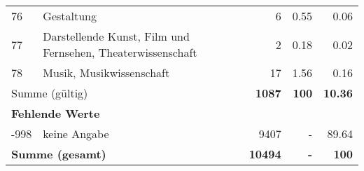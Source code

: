 \begin{longtable}{lXrrr}
        76 & \multicolumn{1}{X}{Gestaltung} & %
          \num{6} &
          \num[round-mode=places,round-precision=2]{0,55} &
          \num[round-mode=places,round-precision=2]{0,06} \\

        77 & \multicolumn{1}{X}{Darstellende Kunst, Film und Fernsehen, Theaterwissenschaft} & %
          \num{2} &
          \num[round-mode=places,round-precision=2]{0,18} &
          \num[round-mode=places,round-precision=2]{0,02} \\

        78 & \multicolumn{1}{X}{Musik, Musikwissenschaft} & %
          \num{17} &
          \num[round-mode=places,round-precision=2]{1,56} &
          \num[round-mode=places,round-precision=2]{0,16} \\

     \midrule
     \multicolumn{2}{l}{Summe (gültig)} &
       \textbf{\num{1087}} &
     \textbf{100} &
       \textbf{\num[round-mode=places,round-precision=2]{10,36}} \\
     \multicolumn{5}{l}{\textbf{Fehlende Werte}}\\
       -998 &
       keine Angabe &
         \num{9407} &
        - &
         \num[round-mode=places,round-precision=2]{89,64} \\
     \midrule
     \multicolumn{2}{l}{\textbf{Summe (gesamt)}} &
          \textbf{\num{10494}} &
        \textbf{-} &
        \textbf{100} \\
     \bottomrule
     \end{longtable}
     
